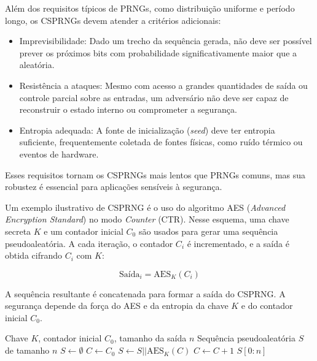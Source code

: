 Além dos requisitos típicos de PRNGs, como distribuição uniforme e período
longo, os CSPRNGs devem atender a critérios adicionais:
\begin{itemize}[noitemsep]
    \item Imprevisibilidade: Dado um trecho da sequência gerada, não deve ser 
	possível prever os próximos bits com probabilidade significativamente 
	maior que a aleatória.
    \item Resistência a ataques: Mesmo com acesso a grandes quantidades de 
	saída ou controle parcial sobre as entradas, um adversário não deve 
	ser capaz de reconstruir o estado interno ou comprometer a segurança.
    \item Entropia adequada: A fonte de inicialização (\textit{seed}) deve ter 
	entropia suficiente, frequentemente coletada de fontes físicas, como 
	ruído térmico ou eventos de hardware.
\end{itemize}

Esses requisitos tornam os CSPRNGs mais lentos que PRNGs comuns, mas sua
robustez é essencial para aplicações sensíveis à segurança.


\begin{example}
Um exemplo ilustrativo de CSPRNG é o uso do algoritmo AES (\textit{Advanced
Encryption Standard}) no modo \textit{Counter} (CTR). Nesse esquema, uma chave
secreta $K$ e um contador inicial $C_0$ são usados para gerar uma sequência
pseudoaleatória. A cada iteração, o contador $C_i$ é incrementado, e a saída é
obtida cifrando $C_i$ com $K$:

\[
\text{Saída}_i = \text{AES}_K(C_i)
\]

A sequência resultante é concatenada para formar a saída do CSPRNG. A segurança
depende da força do AES e da entropia da chave $K$ e do contador inicial $C_0$.

\begin{algorithm}
\caption{Geração de Sequência Pseudoaleatória com AES-CTR}
\begin{algorithmic}
\Require Chave $K$, contador inicial $C_0$, tamanho da saída $n$
\Ensure Sequência pseudoaleatória $S$ de tamanho $n$
\State $S \gets \emptyset$
\State $C \gets C_0$
    \State $S \gets S || \text{AES}_K(C)$
    \State $C \gets C + 1$
\EndWhile
\State \Return $S[0:n]$
\end{algorithmic}
\end{algorithm}


\end{example}


